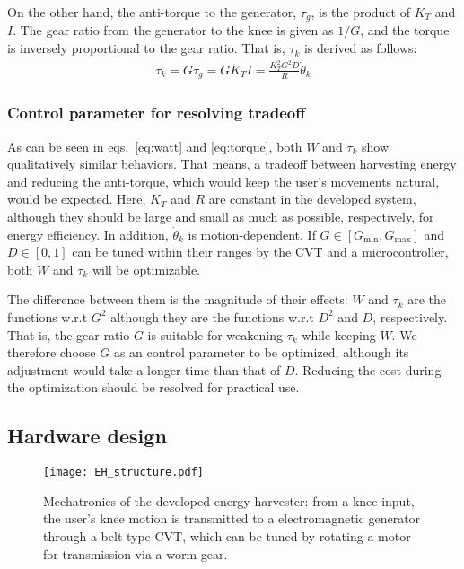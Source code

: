 \documentclass[twocolumn]{svjour3}          %
\begin{document}
On the other hand, the anti-torque to the generator, $\tau_g$, is the product of $K_T$ and $I$.
The gear ratio from the generator to the knee is given as $1/G$, and the torque is inversely proportional to the gear ratio.
That is, $\tau_k$ is derived as follows:
\begin{align}
    \tau_k = G \tau_g = G K_T I = \frac{K^2_T G^2 D}{R} \dot{\theta}_k
    \label{eq:torque}
\end{align}

\subsubsection{Control parameter for resolving tradeoff}

As can be seen in eqs.~\eqref{eq:watt} and \eqref{eq:torque}, both $W$ and $\tau_k$ show qualitatively similar behaviors.
That means, a tradeoff between harvesting energy and reducing the anti-torque, which would keep the user's movements natural, would be expected.
Here, $K_T$ and $R$ are constant in the developed system, although they should be large and small as much as possible, respectively, for energy efficiency.
In addition, $\dot{\theta}_k$ is motion-dependent.
If $G \in [G_\mathrm{min}, G_\mathrm{max}]$ and $D \in [0, 1]$ can be tuned within their ranges by the CVT and a microcontroller, both $W$ and $\tau_k$ will be optimizable.

The difference between them is the magnitude of their effects: $W$ and $\tau_k$ are the functions w.r.t $G^2$ although they are the functions w.r.t $D^2$ and $D$, respectively.
That is, the gear ratio $G$ is suitable for weakening $\tau_k$ while keeping $W$.
We therefore choose $G$ as an control parameter to be optimized, although its adjustment would take a longer time than that of $D$.
Reducing the cost during the optimization should be resolved for practical use.

\subsection{Hardware design}
\label{subsec:hardware}

\begin{figure}[tb]
    \centering
    \texttt{[image: EH\_structure.pdf]}
    \caption{Mechatronics of the developed energy harvester:
    from a knee input, the user's knee motion is transmitted to a electromagnetic generator through a belt-type CVT, which can be tuned by rotating a motor for transmission via a worm gear.
    }
    \label{fig:EH_structure}
\end{figure}
\end{document}
